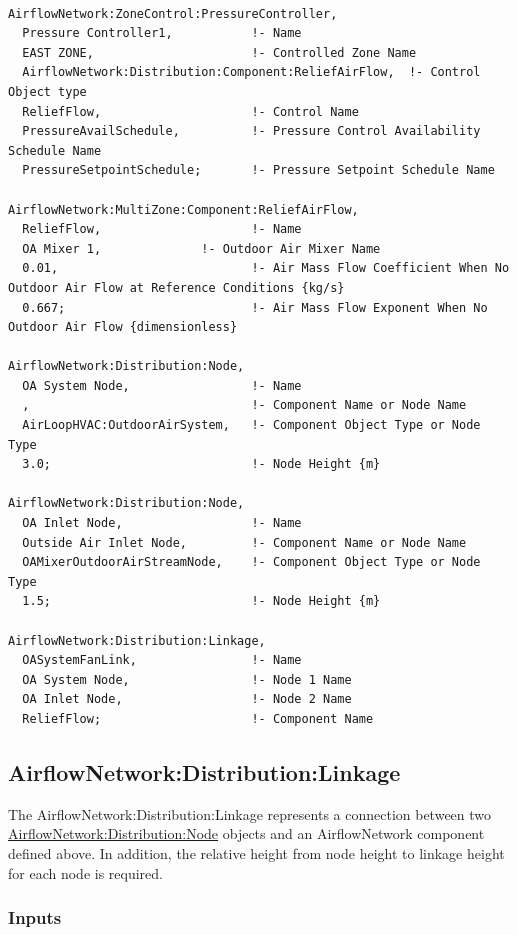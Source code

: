 \begin{lstlisting}

AirflowNetwork:ZoneControl:PressureController,
  Pressure Controller1,           !- Name
  EAST ZONE,                      !- Controlled Zone Name
  AirflowNetwork:Distribution:Component:ReliefAirFlow,  !- Control Object type
  ReliefFlow,                     !- Control Name
  PressureAvailSchedule,          !- Pressure Control Availability Schedule Name
  PressureSetpointSchedule;       !- Pressure Setpoint Schedule Name

AirflowNetwork:MultiZone:Component:ReliefAirFlow,
  ReliefFlow,                     !- Name
  OA Mixer 1,              !- Outdoor Air Mixer Name
  0.01,                           !- Air Mass Flow Coefficient When No Outdoor Air Flow at Reference Conditions {kg/s}
  0.667;                          !- Air Mass Flow Exponent When No Outdoor Air Flow {dimensionless}

AirflowNetwork:Distribution:Node,
  OA System Node,                 !- Name
  ,                               !- Component Name or Node Name
  AirLoopHVAC:OutdoorAirSystem,   !- Component Object Type or Node Type
  3.0;                            !- Node Height {m}

AirflowNetwork:Distribution:Node,
  OA Inlet Node,                  !- Name
  Outside Air Inlet Node,         !- Component Name or Node Name
  OAMixerOutdoorAirStreamNode,    !- Component Object Type or Node Type
  1.5;                            !- Node Height {m}

AirflowNetwork:Distribution:Linkage,
  OASystemFanLink,                !- Name
  OA System Node,                 !- Node 1 Name
  OA Inlet Node,                  !- Node 2 Name
  ReliefFlow;                     !- Component Name

\end{lstlisting}

\subsection{AirflowNetwork:Distribution:Linkage}\label{airflownetworkdistributionlinkage}

The AirflowNetwork:Distribution:Linkage represents a connection between two \hyperref[airflownetworkdistributionnode]{AirflowNetwork:Distribution:Node} objects and an AirflowNetwork component defined above. In addition, the relative height from node height to linkage height for each node is required.

\subsubsection{Inputs}\label{inputs-21}

